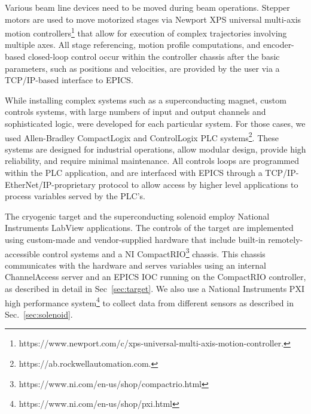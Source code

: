 Various beam line devices need to be moved during beam operations. Stepper motors are used to move motorized stages via Newport XPS universal multi-axis motion controllers\footnote{https://www.newport.com/c/xps-universal-multi-axis-motion-controller.} that allow for execution of complex trajectories involving multiple axes. All stage referencing, motion profile computations, and encoder-based closed-loop control occur within the controller chassis after the basic parameters, such as positions and velocities, are provided by the user via a TCP/IP-based interface to EPICS.   

While installing complex systems such as a superconducting magnet, custom controls systems, with large numbers of input and output channels and sophisticated logic, were developed for each particular system. For those cases, we used Allen-Bradley CompactLogix and ControlLogix PLC systems\footnote{https://ab.rockwellautomation.com.}. These systems are designed for industrial operations, allow modular design, provide high reliability, and require minimal maintenance. All controls loops are programmed within the PLC application, and are interfaced with EPICS through a TCP/IP-EtherNet/IP-proprietary protocol to allow access by higher level applications to process variables served by the PLC's.  

The cryogenic target and the superconducting solenoid employ National Instruments LabView applications. The controls of the target are implemented using custom-made and vendor-supplied hardware that include built-in remotely-accessible control systems and a NI CompactRIO\footnote{https://www.ni.com/en-us/shop/compactrio.html} chassis. This chassis communicates with the hardware and serves variables using an internal ChannelAccess server and an EPICS IOC running on the CompactRIO controller, as described in detail in Sec~\ref{sec:target}. We also use a National Instruments PXI high performance system\footnote{https://www.ni.com/en-us/shop/pxi.html} to collect data from different sensors as described in Sec.~\ref{sec:solenoid}. 


